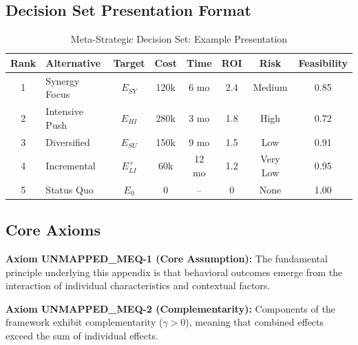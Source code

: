 \subsection{Decision Set Presentation Format}

\begin{table}[H]
\centering
\caption{Meta-Strategic Decision Set: Example Presentation}
\label{tab:meq-decision-example}
\renewcommand{\arraystretch}{1.3}
\small
\begin{tabular}{@{}clcccccc@{}}
\toprule
\textbf{Rank} & \textbf{Alternative} & \textbf{Target} & \textbf{Cost} & \textbf{Time} & \textbf{ROI} & \textbf{Risk} & \textbf{Feasibility} \\
\midrule
1 & Synergy Focus & $E_{SY}$ & 120k & 6 mo & 2.4 & Medium & 0.85 \\
2 & Intensive Push & $E_{HI}$ & 280k & 3 mo & 1.8 & High & 0.72 \\
3 & Diversified & $E_{SU}$ & 150k & 9 mo & 1.5 & Low & 0.91 \\
4 & Incremental & $E_{LI}^+$ & 60k & 12 mo & 1.2 & Very Low & 0.95 \\
5 & Status Quo & $E_0$ & 0 & -- & 0 & None & 1.00 \\
\bottomrule
\end{tabular}
\end{table}


\subsection{Core Axioms}
\label{sec:meq-axioms}

\begin{tcolorbox}[colback=yellow!5!white,colframe=yellow!75!black,title=Axiom UNMAPPED_MEQ-1: Fundamental Principle]
\textbf{Axiom UNMAPPED_MEQ-1 (Core Assumption):}
The fundamental principle underlying this appendix is that behavioral outcomes
emerge from the interaction of individual characteristics and contextual factors.
\end{tcolorbox}

\begin{tcolorbox}[colback=yellow!5!white,colframe=yellow!75!black,title=Axiom UNMAPPED_MEQ-2: Complementarity]
\textbf{Axiom UNMAPPED_MEQ-2 (Complementarity):}
Components of the framework exhibit complementarity ($\gamma > 0$), meaning
that combined effects exceed the sum of individual effects.
\end{tcolorbox}



